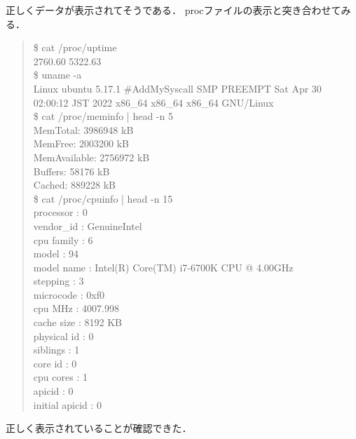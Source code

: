 正しくデータが表示されてそうである．
procファイルの表示と突き合わせてみる．
\begin{quote}
\$ cat /proc/uptime  \\
2760.60 5322.63 \\
\$ uname -a \\
Linux ubuntu 5.17.1 \#AddMySyscall SMP PREEMPT Sat Apr 30 02:00:12 JST 2022 x86\_64 x86\_64 x86\_64 GNU/Linux \\
\$ cat /proc/meminfo | head -n 5 \\
MemTotal:        3986948 kB \\
MemFree:         2003200 kB \\
MemAvailable:    2756972 kB \\
Buffers:           58176 kB \\
Cached:           889228 kB \\
\$ cat /proc/cpuinfo | head -n 15 \\
processor	: 0 \\
vendor\_id	: GenuineIntel \\
cpu family	: 6 \\
model		: 94 \\
model name	: Intel(R) Core(TM) i7-6700K CPU @ 4.00GHz \\
stepping	: 3 \\
microcode	: 0xf0 \\
cpu MHz		: 4007.998 \\
cache size	: 8192 KB \\
physical id	: 0 \\
siblings	: 1 \\
core id		: 0 \\
cpu cores	: 1 \\
apicid		: 0 \\
initial apicid	: 0
\end{quote}

正しく表示されていることが確認できた．


